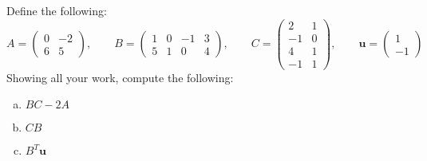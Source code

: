 \documentclass[11pt,letterpaper]{article}
\begin{document}
 Define the following:
	\[
	A= \begin{pmatrix} 0 & -2 \\ 6 & 5 \end{pmatrix}, \qquad
	B= \begin{pmatrix} 1 & 0 & -1 & 3 \\ 5 & 1 & 0 & 4 \end{pmatrix}, \qquad
	C= \begin{pmatrix} 2 & 1 \\ -1 & 0 \\ 4 & 1 \\ -1 & 1 \end{pmatrix}, \qquad
	\mathbf{u}= \begin{pmatrix} 1 \\ -1 \end{pmatrix}
	\]
Showing all your work, compute the following:
	\begin{enumerate}[(a)]
	\item $BC - 2A$
	\item $CB$
	\item $B^T \mathbf{u}$
	\end{enumerate} \pspace
\end{document}
